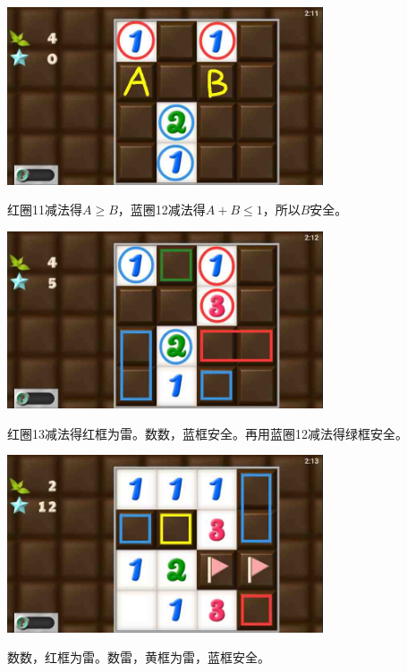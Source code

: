 \subsection{} %
\begin{center}
    \includegraphics[width=0.7\textwidth]{puzzlelow/142-1.jpg}
\end{center}
红圈11减法得$A\ge B$，蓝圈12减法得$A+B\le 1$，所以$B$安全。
\begin{center}
    \includegraphics[width=0.7\textwidth]{puzzlelow/142-2.jpg}
\end{center}
红圈13减法得红框为雷。数数，蓝框安全。再用蓝圈12减法得绿框安全。
\begin{center}
    \includegraphics[width=0.7\textwidth]{puzzlelow/142-3.jpg}
\end{center}
数数，红框为雷。数雷，黄框为雷，蓝框安全。

